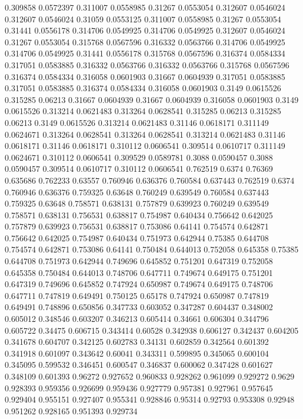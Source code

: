 0.309858 0.0572397
0.311007 0.0558985
0.31267 0.0553054
0.312607 0.0546024
0.312607 0.0546024
0.31059 0.0553125
0.311007 0.0558985
0.31267 0.0553054
0.31441 0.0556178
0.314706 0.0549925
0.314706 0.0549925
0.312607 0.0546024
0.31267 0.0553054
0.315768 0.0567596
0.316332 0.0563766
0.314706 0.0549925
0.314706 0.0549925
0.31441 0.0556178
0.315768 0.0567596
0.316374 0.0584334
0.317051 0.0583885
0.316332 0.0563766
0.316332 0.0563766
0.315768 0.0567596
0.316374 0.0584334
0.316058 0.0601903
0.31667 0.0604939
0.317051 0.0583885
0.317051 0.0583885
0.316374 0.0584334
0.316058 0.0601903
0.3149 0.0615526
0.315285 0.06213
0.31667 0.0604939
0.31667 0.0604939
0.316058 0.0601903
0.3149 0.0615526
0.313214 0.0621483
0.313264 0.0628541
0.315285 0.06213
0.315285 0.06213
0.3149 0.0615526
0.313214 0.0621483
0.31146 0.0618171
0.311149 0.0624671
0.313264 0.0628541
0.313264 0.0628541
0.313214 0.0621483
0.31146 0.0618171
0.31146 0.0618171
0.310112 0.0606541
0.309514 0.0610717
0.311149 0.0624671
0.310112 0.0606541
0.309529 0.0589781
0.3088 0.0590457
0.3088 0.0590457
0.309514 0.0610717
0.310112 0.0606541
0.762519 0.6374
0.76369 0.635686
0.762233 0.63557
0.760946 0.636376
0.760584 0.637443
0.762519 0.6374
0.760946 0.636376
0.759325 0.63648
0.760249 0.639549
0.760584 0.637443
0.759325 0.63648
0.758571 0.638131
0.757879 0.639923
0.760249 0.639549
0.758571 0.638131
0.756531 0.638817
0.754987 0.640434
0.756642 0.642025
0.757879 0.639923
0.756531 0.638817
0.753086 0.64141
0.754574 0.642871
0.756642 0.642025
0.754987 0.640434
0.751973 0.642944
0.75385 0.644708
0.754574 0.642871
0.753086 0.64141
0.750484 0.644013
0.752058 0.645358
0.75385 0.644708
0.751973 0.642944
0.749696 0.645852
0.751201 0.647319
0.752058 0.645358
0.750484 0.644013
0.748706 0.647711
0.749674 0.649175
0.751201 0.647319
0.749696 0.645852
0.747924 0.650987
0.749674 0.649175
0.748706 0.647711
0.747819 0.649491
0.750125 0.65178
0.747924 0.650987
0.747819 0.649491
0.748896 0.650856
0.347733 0.603052
0.347287 0.604437
0.348002 0.605012
0.348546 0.603207
0.346213 0.605414
0.34661 0.606304
0.344796 0.605722
0.34475 0.606715
0.343414 0.60528
0.342938 0.606127
0.342437 0.604205
0.341678 0.604707
0.342125 0.602783
0.34131 0.602859
0.342564 0.601392
0.341918 0.601097
0.343642 0.60041
0.343311 0.599895
0.345065 0.600104
0.345095 0.599532
0.346451 0.600547
0.346837 0.600062
0.347428 0.601627
0.348109 0.601393
0.96272 0.927652
0.960833 0.928262
0.961099 0.929272
0.9629 0.928393
0.959356 0.926699
0.959436 0.927779
0.957381 0.927961
0.957645 0.929404
0.955151 0.927407
0.955341 0.928846
0.95314 0.92793
0.953308 0.92948
0.951262 0.928165
0.951393 0.929734
